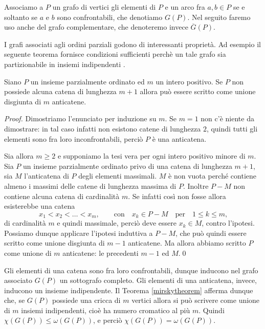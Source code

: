 Associamo a \(P\) un grafo di vertici gli elementi di \(P\) e un arco fra \(a\text{,}\,b\in P\) se e soltanto se \(a\) e \(b\) sono confrontabili, che denotiamo \(G(P)\). Nel seguito faremo uso anche del grafo complementare, che denoteremo invece \(\overline{G}(P)\).

I grafi associati agli ordini parziali godono di interessanti proprietà. Ad esempio il seguente teorema fornisce condizioni sufficienti perchè un tale grafo sia partizionabile in insiemi indipendenti \cite{Mirsky1971}.
\begin{theorem}
  [Mirsky] \label{mirskytheorem} Siano \(P\) un insieme parzialmente ordinato ed \(m\) un intero positivo. Se \(P\) non possiede alcuna catena di lunghezza \(m+1\) allora può essere scritto come unione disgiunta di \(m\) anticatene. 
\end{theorem}
\begin{proof}
  Dimostriamo l'enunciato per induzione su \(m\). Se \(m=1\) non c'è niente da dimostrare: in tal caso infatti non esistono catene di lunghezza \(2\), quindi tutti gli elementi sono fra loro inconfrontabili, perciò \(P\) è una anticatena. 
  
  Sia allora \(m\ge 2\) e supponiamo la tesi vera per ogni intero positivo minore di \(m\). Sia \(P\) un insieme parzialmente ordinato privo di una catena di lunghezza \(m+1\), sia \(M\) l'anticatena di \(P\) degli elementi massimali. \(M\) è non vuota perché contiene almeno i massimi delle catene di lunghezza massima di \(P\). Inoltre \(P-M\) non contiene alcuna catena di cardinalità \(m\). Se infatti così non fosse allora esisterebbe una catena
  \[
    x_1 < x_2 < \dots < x_m,  \qquad\text{con}\quad x_k \in P-M\quad\text{per}\quad 1\le k \le m\text{,}
  \]
  di cardinalità \(m\) e quindi massimale, perciò deve essere \(x_k\in M\), contro l'ipotesi. Possiamo dunque applicare l'ipotesi induttiva a \(P-M\), che può quindi essere scritto come unione disgiunta di \(m-1\) anticatene. Ma allora abbiamo scritto \(P\) come unione di \(m\) anticatene: le precedenti \(m-1\) ed \(M\).\qed
\end{proof}

Gli elementi di una catena sono fra loro confrontabili, dunque inducono nel grafo associato \(G(P)\) un sottografo completo. Gli elementi di una anticatena, invece, inducono un insieme indipendente. Il Teorema \ref{mirskytheorem} afferma dunque che, se \(G(P)\) possiede una cricca di \(m\) vertici allora si pu\`o scrivere come unione di \(m\) insiemi indipendenti, cio\`e ha numero cromatico al più \(m\). Quindi \(\chi(G(P))\le \omega(G(P))\), e perciò \(\chi(G(P))=\omega(G(P))\).

